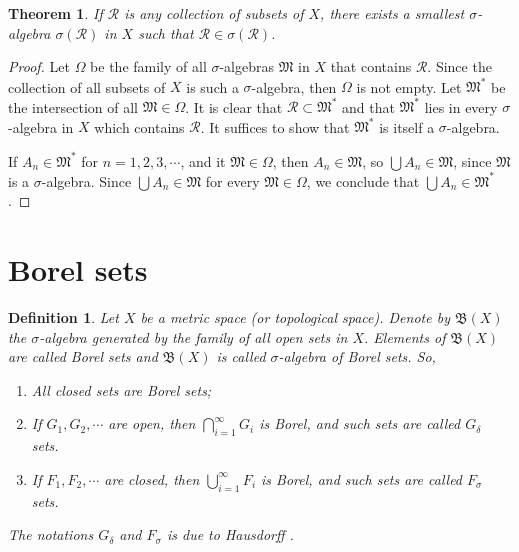 \documentclass[11pt]{book}
\newtheorem{definition}{Definition}[chapter]
\newtheorem{theorem}{Theorem}[chapter]
\theoremstyle{definition}
\numberwithin{equation}{chapter}
\def\MM{\mathfrak{M}}
\begin{document}
\begin{theorem}{\rm \cite{2}}
If $\mathcal{R}$ is any collection of subsets of $X$, there exists a smallest $\sigma$-algebra $\sigma(\mathcal{R})$ in $X$ such that $\mathcal{R} \in \sigma(\mathcal{R})$.
\end{theorem}
\begin{proof}
Let $\Omega$ be the family of all $\sigma$-algebras $\MM$ in $X$ that contains $\mathcal{R}$. Since
the collection of all subsets of $X$ is such a $\sigma$-algebra, then $\Omega$ is not empty. Let $\MM^*$ be the intersection of all $\MM \in \Omega$. It is clear that $\mathcal{R} \subset \MM^*$ and that $\MM^*$ lies in every $\sigma$-algebra in $X$ which contains $\mathcal{R}$. It suffices to show that $\MM^*$ is itself a $\sigma$-algebra.

If $A_n \in \MM^*$ for $n = 1,2,3,\cdots$, and it $\MM \in \Omega$, then $A_n \in \MM$, so $\bigcup A_n \in \MM$, since $\MM$ is a $\sigma$-algebra. Since $\bigcup A_n \in \MM$ for every $\MM \in \Omega$, we conclude that $\bigcup A_n \in \MM^*$.
\end{proof}

\medskip


\section{Borel sets}

\begin{definition}
Let $X$ be a metric space (or topological space). Denote by $\mathfrak{B}(X)$ the $\sigma$-algebra generated by the family of all open sets in $X$. Elements of $\mathfrak{B}(X)$ are called Borel sets and $\mathfrak{B}(X)$ is called $\sigma$-algebra of Borel sets. So,
\begin{enumerate}[label=(\alph*)]
    \item All closed sets are Borel sets;
    
    \item If $G_1, G_2, \cdots$ are open, then $\bigcap^\infty_{i=1}G_i$ is Borel, and such sets are called $G_\delta$ sets.
    
    \item If $F_1, F_2, \cdots$ are closed, then $\bigcup^\infty_{i=1}F_i$ is Borel, and such sets are called $F_\sigma$ sets.
\end{enumerate}
The notations $G_\delta$ and $F_\sigma$ is due to Hausdorff {\rm \cite{2}}.
\end{definition}

\medskip
\end{document}
